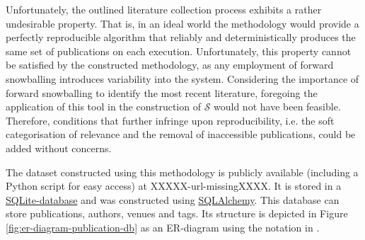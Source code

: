 \documentclass[11pt,a4paper]{book}
\theoremstyle{definition}
\theoremstyle{definition}
\theoremstyle{definition}
\theoremstyle{remark}
\newcommand{\tpsetb}{\mathcal{S}_{\mathit{-1}}}
\newcommand{\tpsetbb}{\mathcal{S}_{\mathit{-2}}}
\newcommand{\tpsetf}{\mathcal{S}_{\mathit{+1}}}
\newcommand{\tpsetff}{\mathcal{S}_{\mathit{+2}}}
\newcommand{\tpsetfb}{\mathcal{S}_{\mathit{+1-1}}}
\newcommand{\tpsetffb}{\mathcal{S}_{\mathit{+2-1}}}
\newcommand{\pset}{S}
\newcommand{\psetz}{S_{\mathit{0}}}
\newcommand{\psetb}{S_{\mathit{-1}}}
\newcommand{\psetbb}{S_{\mathit{-2}}}
\newcommand{\psetf}{S_{\mathit{+1}}}
\newcommand{\psetff}{S_{\mathit{+2}}}
\newcommand{\psetfb}{S_{\mathit{+1-1}}}
\newcommand{\psetffb}{S_{\mathit{+2-1}}}
\newcommand{\xset}{\mathcal{S}}
\begin{document}
%


Unfortunately, the outlined literature collection process exhibits a rather undesirable property. That is, in an ideal world the methodology would provide a perfectly reproducible algorithm that reliably and deterministically produces the same set of publications on each execution.
Unfortunately, this property cannot be satisfied by the constructed methodology, as any employment of forward snowballing introduces variability into the system. Considering the importance of forward snowballing to identify the most recent literature, foregoing the application of this tool in the construction of $\xset$ would not have been feasible. Therefore, conditions that further infringe upon reproducibility, i.e. the soft categorisation of relevance and the removal of inaccessible publications, could be added without concerns.



The dataset constructed using this methodology is publicly available (including a Python script for easy access) at XXXXX-url-missingXXXX. It is stored in a \href{https://www.sqlite.org/index.html}{SQLite-database} and was constructed using \href{https://www.sqlalchemy.org}{SQLAlchemy}.
This database can store publications, authors, venues and tags. Its structure is depicted in Figure \ref{fig:er-diagram-publication-db} as an ER-diagram using the notation in \parencite{chen1976entity}.
\end{document}
